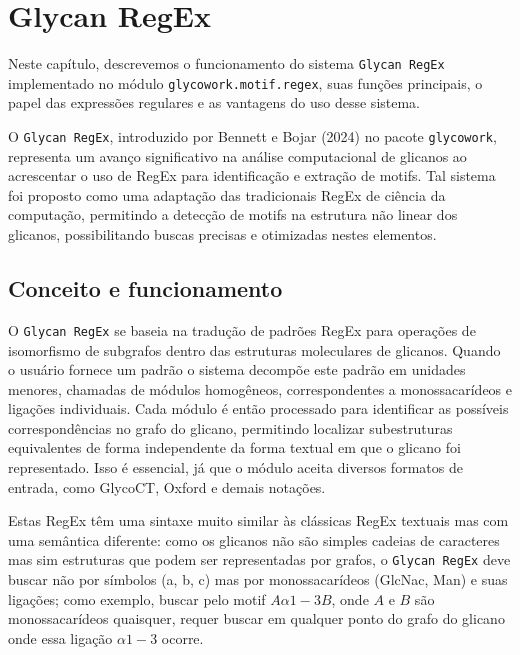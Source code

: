\chapter{Glycan RegEx}

Neste capítulo, descrevemos o funcionamento do sistema \texttt{Glycan RegEx}
implementado no módulo \texttt{glycowork.motif.regex}, suas funções principais,
o papel das expressões regulares e as vantagens do uso desse sistema.

O \texttt{Glycan RegEx}, introduzido por Bennett e Bojar (2024) no pacote
\texttt{glycowork}, representa um avanço significativo na análise computacional
de glicanos ao acrescentar o uso de RegEx para identificação e extração de
motifs. Tal sistema foi proposto como uma adaptação das tradicionais RegEx de
ciência da computação, permitindo a detecção de motifs na estrutura não linear
dos glicanos, possibilitando buscas precisas e otimizadas nestes elementos.

\section{Conceito e funcionamento}

O \texttt{Glycan RegEx} se baseia na tradução de padrões RegEx para operações
de isomorfismo de subgrafos dentro das estruturas moleculares de glicanos.
Quando o usuário fornece um padrão o sistema decompõe este padrão em unidades
menores, chamadas de módulos homogêneos, correspondentes a monossacarídeos e
ligações individuais. Cada módulo é então processado para identificar as
possíveis correspondências no grafo do glicano, permitindo localizar
subestruturas equivalentes de forma independente da forma textual em que o
glicano foi representado. Isso é essencial, já que o módulo aceita diversos
formatos de entrada, como GlycoCT, Oxford e demais notações.

Estas RegEx têm uma sintaxe muito similar às clássicas RegEx textuais mas com
uma semântica diferente: como os glicanos não são simples cadeias de caracteres
mas sim estruturas que podem ser representadas por grafos, o \texttt{Glycan
	RegEx} deve buscar não por símbolos (a, b, c) mas por monossacarídeos (GlcNac,
Man) e suas ligações; como exemplo, buscar pelo motif $A\alpha1-3B$, onde $A$ e
$B$ são monossacarídeos quaisquer, requer buscar em qualquer ponto do grafo do
glicano onde essa ligação $\alpha1-3$ ocorre.

